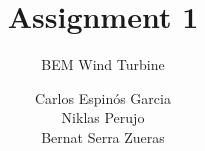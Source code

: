 \documentclass[whitelogo]{tudelft-report}
\begin{document}
\frontmatter


\title[tudelft-white]{Assignment 1}
\subtitle[tudelft-black]{BEM Wind Turbine}
\author[tudelft-white]{ Carlos Espinós Garcia \\
    Niklas Perujo \\  
    Bernat Serra Zueras }
\makecover[split]


%

% 

\tableofcontents

\mainmatter







%



\appendix

%


\end{document}
